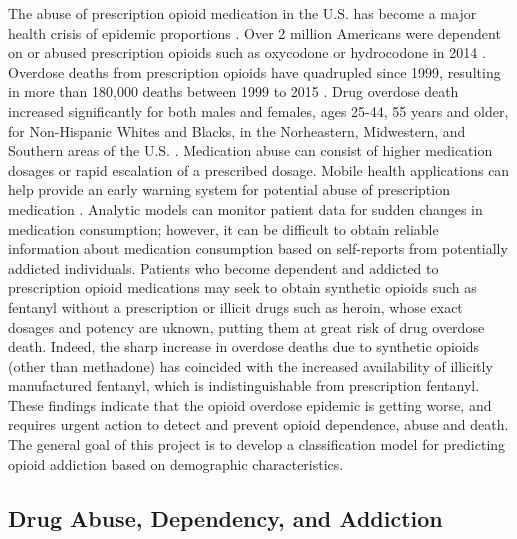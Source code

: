 \documentclass[sigconf]{acmart}
\begin{document}
The abuse of prescription opioid medication in the U.S. has become a major 
health crisis of epidemic proportions \cite{volkow14}. Over 2 million Americans 
were dependent on or abused prescription opioids such as oxycodone or 
hydrocodone in 2014 \cite{cdc17}. Overdose deaths from prescription opioids 
have quadrupled since 1999, resulting in more than 180,000 deaths between 1999 
to 2015 \cite{nida17}. Drug overdose death increased significantly for both 
males and females, ages 25-44, 55 years and older, for Non-Hispanic Whites 
and Blacks, in the Norheastern, Midwestern, and Southern areas of the U.S.
\cite{cdc16}. Medication abuse can consist of higher medication dosages or rapid 
escalation of a prescribed dosage. Mobile health applications can help provide 
an early warning system for potential abuse of prescription medication 
\cite{varshney13}. Analytic models can monitor patient data for sudden changes 
in medication consumption; however, it can be difficult to obtain reliable 
information about medication consumption based on self-reports from potentially
addicted individuals. Patients who become dependent and addicted to  
prescription opioid medications may seek to obtain synthetic opioids such as 
fentanyl without a prescription or illicit drugs such as heroin, whose exact 
dosages and potency are uknown, putting them at great risk of drug overdose 
death. Indeed, the sharp increase in overdose deaths due to synthetic opioids 
(other than methadone) has coincided with the increased availability of 
illicitly manufactured fentanyl, which is indistinguishable from prescription 
fentanyl. These findings indicate that the opioid overdose epidemic is getting
worse, and requires urgent action to detect and prevent opioid dependence, 
abuse and death. The general goal of this project is to develop a classification 
model for predicting opioid addiction based on demographic characteristics.  

\subsection{Drug Abuse, Dependency, and Addiction}
\end{document}
